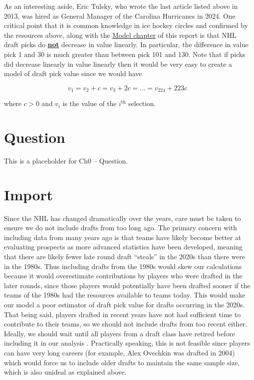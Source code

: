 \documentclass[
  letterpaper,
  DIV=11,
  numbers=noendperiod]{scrreprt}
\begin{document}
As an interesting aside, Eric Tulsky, who wrote the last article listed
above in 2013, was hired as General Manager of the Carolina Hurricanes
in 2024. One critical point that it is common knowledge in ice hockey
circles and confirmed by the resources above, along with the
\href{https://trevsteu.github.io/Stat468_Final/model.html}{Model
chapter} of this report is that NHL draft picks do \ul{\textbf{not}}
decrease in value linearly. In particular, the difference in value pick
1 and 30 is much greater than between pick 101 and 130. Note that if
picks did decrease linearly in value linearly then it would be very easy
to create a model of draft pick value since we would have

\[
v_1 = v_2 + c = v_3 + 2c = ... = v_{224} + 223c
\]

where \(c > 0\) and \(v_i\) is the value of the \(i^{\text{th}}\)
selection.


\chapter{Question}\label{question}

This is a placeholder for Ch0 -- Question.


\chapter{Import}\label{import}

Since the NHL has changed dramatically over the years, care must be
taken to ensure we do not include drafts from too long ago. The primary
concern with including data from many years ago is that teams have
likely become better at evaluating prospects as more advanced statistics
have been developed, meaning that there are likely fewer late round
draft ``steals'' in the 2020s than there were in the 1980s. Thus
including drafts from the 1980s would skew our calculations because it
would overestimate contributions by players who were drafted in the
later rounds, since those players would potentially have been drafted
sooner if the teams of the 1980s had the resources available to teams
today. This would make our model a poor estimator of draft pick value
for drafts occurring in the 2020s. That being said, players drafted in
recent years have not had sufficient time to contribute to their teams,
so we should not include drafts from too recent either. Ideally, we
should wait until all players from a draft class have retired before
including it in our analysis . Practically speaking, this is not
feasible since players can have very long careers (for example, Alex
Ovechkin was drafted in 2004) which would force us to include older
drafts to maintain the same sample size, which is also unideal as
explained above.
\end{document}
